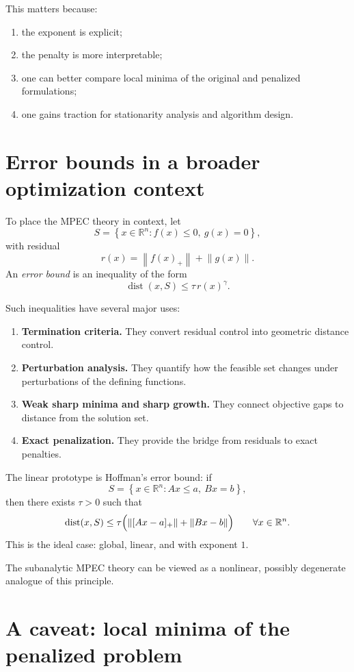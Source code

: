 \documentclass[pdflatex,sn-mathphys-num]{sn-jnl}%
\theoremstyle{definition}
\newcommand{\R}{\mathbb{R}}
\newcommand{\dist}{\operatorname{dist}}
\newcommand{\norm}[1]{\left\lVert #1 \right\rVert}
\newcommand{\set}[1]{\left\{ #1 \right\}}
\begin{document}
This matters because:
\begin{enumerate}[label=(\roman*)]
    \item the exponent is explicit;
    \item the penalty is more interpretable;
    \item one can better compare local minima of the original and penalized formulations;
    \item one gains traction for stationarity analysis and algorithm design.
\end{enumerate}

\section{Error bounds in a broader optimization context}

To place the MPEC theory in context, let
\[
S=\set{x\in\R^n : f(x)\le 0,\ g(x)=0},
\]
with residual
\[
r(x)=\norm{f(x)_+}+\norm{g(x)}.
\]
An \emph{error bound} is an inequality of the form
\[
\dist(x,S)\le \tau\,r(x)^\gamma.
\]

Such inequalities have several major uses:

\begin{enumerate}[label=(\roman*)]
    \item \textbf{Termination criteria.} They convert residual control into geometric distance control.
    \item \textbf{Perturbation analysis.} They quantify how the feasible set changes under perturbations of the defining functions.
    \item \textbf{Weak sharp minima and sharp growth.} They connect objective gaps to distance from the solution set.
    \item \textbf{Exact penalization.} They provide the bridge from residuals to exact penalties.
\end{enumerate}

The linear prototype is Hoffman's error bound: if
\[
S=\set{x\in\R^n: Ax\le a,\ Bx=b},
\]
then there exists $\tau>0$ such that
\[
\dist(x,S)\le \tau\Bigl(\norm{[Ax-a]_+}+\norm{Bx-b}\Bigr)\qquad \forall x\in \R^n.
\]
This is the ideal case: global, linear, and with exponent $1$.

The subanalytic MPEC theory can be viewed as a nonlinear, possibly degenerate analogue of this principle.

\section{A caveat: local minima of the penalized problem}
\end{document}
